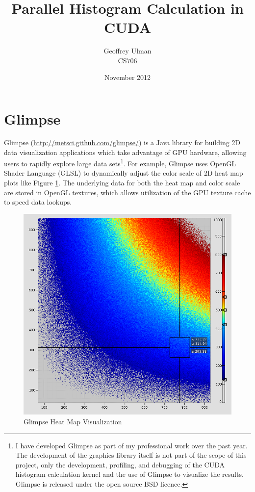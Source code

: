 \documentclass{article}
\begin{document}
\title{Parallel Histogram Calculation in CUDA}
\author{Geoffrey Ulman\\
        CS706}
\date{November 2012}
\maketitle

\section{Glimpse}\label{glimpse}

Glimpse (\url{http://metsci.github.com/glimpse/}) is a Java library for building 2D data visualization applications which take advantage of GPU hardware, allowing users to rapidly explore large data sets\footnote{I have developed Glimpse as part of my professional work over the past year. The development of the graphics library itself is not part of the scope of this project, only the development, profiling, and debugging of the CUDA histogram calculation kernel and the use of Glimpse to visualize the results. Glimpse is released under the open source BSD licence.}. For example, Glimpse uses OpenGL Shader Language (GLSL) to dynamically adjust the color scale of 2D heat map plots like Figure \ref{heatmap}. The underlying data for both the heat map and color scale are stored in OpenGL textures, which allows utilization of the GPU texture cache to speed data lookups.

\begin{figure}
\centering
\includegraphics[width=1.0\textwidth]{screenshots/glimpse/TaggedHeatMapExample.png}
\caption{Glimpse Heat Map Visualization\cite{glimpse.com}}
\label{heatmap}
\end{figure}
\end{document}
